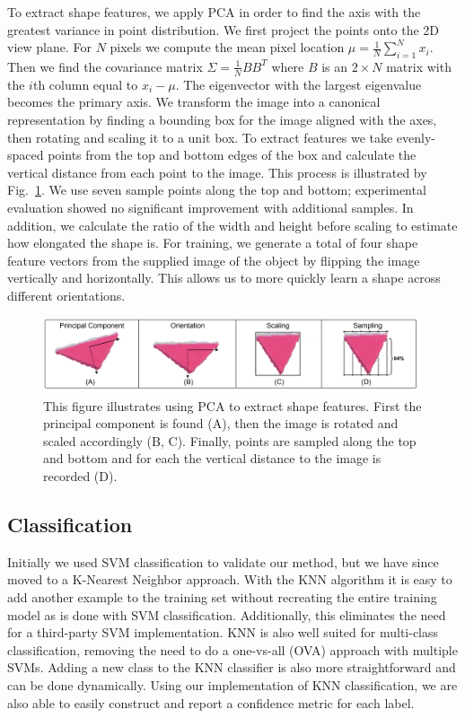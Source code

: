 \documentclass[11pt]{article}
\begin{document}
To extract shape features, we apply PCA in order to find the axis with the
greatest variance in point distribution. We first project the points onto the
2D view plane. For $N$ pixels we compute the mean pixel location $\mu =
\frac{1}{N}\displaystyle\sum_{i=1}^{N}x_i$. Then we find the covariance matrix
$\Sigma = \frac{1}{N} BB^T$ where $B$ is an $2\times N$ matrix with the $i$th
column equal to $x_i - \mu$. The eigenvector with the largest eigenvalue
becomes the primary axis. We transform the image into a canonical representation
by finding a bounding box for the image aligned with the axes, then rotating and
scaling it to a unit box. To extract features we take evenly-spaced
points from the top and bottom edges of the box and calculate the vertical distance
from each point to the image. This process is illustrated by Fig.~\ref{fig:pca}. We use seven
sample points along the top and bottom; experimental evaluation showed no significant
improvement with additional samples. In addition, we calculate the ratio of the width
and height before scaling to estimate how elongated the shape is. For
training, we generate a total of four shape feature vectors from the supplied
image of the object by flipping the image vertically and horizontally. This allows
us to more quickly learn a shape across different orientations.

\begin{figure}[h!]
\centering
    \includegraphics[width=1.0\textwidth]{figures/PCA_example.png}
    \caption{This figure illustrates using PCA to extract shape features.
        First the principal component is found (A), then the image is rotated
        and scaled accordingly (B, C). Finally, points are sampled along
        the top and bottom and for each the vertical distance to the image
        is recorded (D).}
    \label{fig:pca}
\end{figure}

\subsection{Classification}
Initially we used SVM classification to validate our method, but we have since
moved to a K-Nearest Neighbor approach. With the KNN algorithm
it is easy to add another example to the training set without recreating the
entire training model as is done with SVM classification. Additionally, this
eliminates the need for a third-party SVM implementation. KNN is also well
suited for multi-class classification, removing
the need to do a one-vs-all (OVA) approach with multiple SVMs. Adding a new
class to the KNN classifier is also more straightforward and can be done dynamically. Using our
implementation of KNN classification, we are also able to easily construct and
report a confidence metric for each label.
\end{document}

